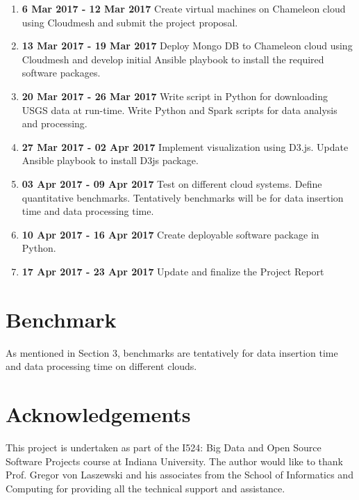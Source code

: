 \documentclass[9pt,twocolumn,twoside]{styles/osajnl}
\begin{document}
\begin{enumerate}

\item {\bfseries 6 Mar 2017 - 12 Mar 2017} Create virtual machines on Chameleon
cloud using Cloudmesh and submit the project proposal.

\item {\bfseries 13 Mar 2017 - 19 Mar 2017} Deploy Mongo DB to Chameleon
cloud using Cloudmesh and develop initial Ansible playbook to install the required software packages.

\item {\bfseries 20 Mar 2017 - 26 Mar 2017} Write script in Python for downloading USGS data at run-time. Write Python and Spark scripts for data analysis and processing.  

\item {\bfseries 27 Mar 2017 - 02 Apr 2017} Implement visualization using D3.js. Update Ansible playbook to install D3js package. 

\item {\bfseries 03 Apr 2017 - 09 Apr 2017} Test on different cloud systems. Define quantitative benchmarks. Tentatively benchmarks will be for data insertion time and data processing time.

\item {\bfseries 10 Apr 2017 - 16 Apr 2017} Create deployable software package
in Python.

\item {\bfseries 17 Apr 2017 - 23 Apr 2017} Update and finalize the Project Report
\end{enumerate}

\section{Benchmark}

As mentioned in Section 3, benchmarks are tentatively for data insertion time and data processing time on different clouds.  

\section {Acknowledgements}

This project is undertaken as part of the I524: Big Data and Open Source Software Projects course at Indiana University. The author would like to thank Prof. Gregor von Laszewski and his associates from the School of Informatics and Computing for providing all the technical support and assistance.
\end{document}
